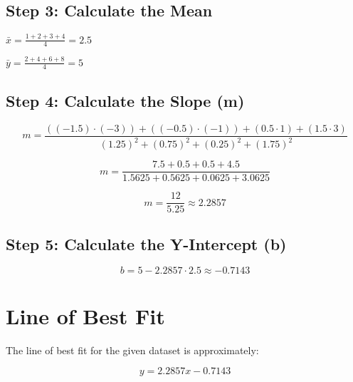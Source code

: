 \documentclass{article}
\begin{document}
\subsection{Step 3: Calculate the Mean}

$\bar{x} = \frac{1 + 2 + 3 + 4}{4} = 2.5$

$\bar{y} = \frac{2 + 4 + 6 + 8}{4} = 5$

\subsection{Step 4: Calculate the Slope (m)}

\[ m = \frac{((-1.5) \cdot (-3)) + ((-0.5) \cdot (-1)) + (0.5 \cdot 1) + (1.5 \cdot 3)}{(1.25)^2 + (0.75)^2 + (0.25)^2 + (1.75)^2} \]

\[ m = \frac{7.5 + 0.5 + 0.5 + 4.5}{1.5625 + 0.5625 + 0.0625 + 3.0625} \]

\[ m = \frac{12}{5.25} \approx 2.2857 \]

\subsection{Step 5: Calculate the Y-Intercept (b)}

\[ b = 5 - 2.2857 \cdot 2.5 \approx -0.7143 \]

\section{Line of Best Fit}

The line of best fit for the given dataset is approximately:

\[ y = 2.2857x - 0.7143 \]
\end{document}
